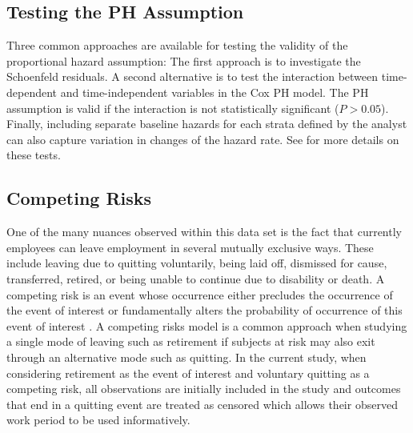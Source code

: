 \documentclass[12pt,letterpaper]{article}
\begin{document}
\subsection{Testing the PH Assumption}
Three common approaches are available for testing the validity of the proportional hazard assumption: The first approach is to investigate the Schoenfeld residuals. A second alternative is to test the interaction between time-dependent and time-independent variables in the Cox PH model. The PH assumption is valid if the interaction is not statistically significant ($P>0.05$). Finally, including separate baseline hazards for each strata defined by the analyst can also capture variation in changes of the hazard rate. See \citet{allison2010,collett2015} for more details on these tests.


\subsection{Competing Risks}
One of the many nuances observed within this data set is the fact that currently employees can leave employment in several mutually exclusive ways. These include leaving due to quitting voluntarily, being laid off, dismissed for cause, transferred, retired, or being unable to continue due to disability or death. A competing risk is an event whose occurrence either precludes the occurrence of the event of interest or fundamentally alters the probability of occurrence of this event of interest \citep{tableman2003}.  A competing risks model is a common approach when studying a single mode of leaving such as retirement if subjects at risk may also exit through an alternative mode such as quitting. In the current study, when considering retirement as the event of interest and voluntary quitting as a competing risk, all observations are initially included in the study and outcomes that end in a quitting event are treated as censored which allows their observed work period to be used informatively.
\end{document}

